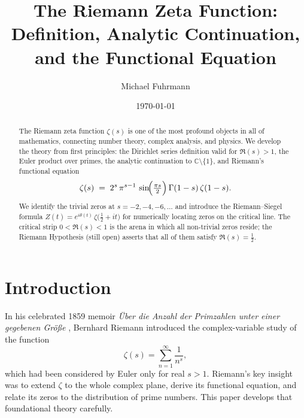 \documentclass[12pt,a4paper]{amsart}
\theoremstyle{definition}
\newcommand{\C}{\mathbb{C}}
\begin{document}

\title{The Riemann Zeta Function:\\
       Definition, Analytic Continuation, and the Functional Equation}

\author{Michael Fuhrmann}
\address{Specialist Mathematics Project, Build 84}
\date{\today}

\begin{abstract}
The Riemann zeta function $\zeta(s)$ is one of the most profound objects in
all of mathematics, connecting number theory, complex analysis, and physics.
We develop the theory from first principles: the Dirichlet series definition
valid for $\Re(s) > 1$, the Euler product over primes, the analytic
continuation to $\C \setminus \{1\}$, and Riemann's functional equation
\[
  \zeta(s) \;=\; 2^s\,\pi^{s-1}\,\sin\!\Bigl(\tfrac{\pi s}{2}\Bigr)\,
  \Gamma(1-s)\,\zeta(1-s).
\]
We identify the trivial zeros at $s = -2, -4, -6, \ldots$ and introduce the
Riemann--Siegel formula $Z(t) = e^{i\theta(t)}\,\zeta\!\bigl(\tfrac{1}{2}+it\bigr)$
for numerically locating zeros on the critical line.
The critical strip $0 < \Re(s) < 1$ is the arena in which all
non-trivial zeros reside; the Riemann Hypothesis (still open) asserts
that all of them satisfy $\Re(s) = \tfrac{1}{2}$.
\end{abstract}

\maketitle
\tableofcontents

\section{Introduction}

In his celebrated 1859 memoir \emph{\"Uber die Anzahl der Primzahlen unter
einer gegebenen Gr\"o\ss e} \cite{Riemann1859}, Bernhard Riemann introduced
the complex-variable study of the function
\[
  \zeta(s) = \sum_{n=1}^{\infty} \frac{1}{n^s},
\]
which had been considered by Euler only for real $s > 1$.
Riemann's key insight was to extend $\zeta$ to the whole complex plane,
derive its functional equation, and relate its zeros to the distribution
of prime numbers.  This paper develops that foundational theory carefully.
\end{document}
